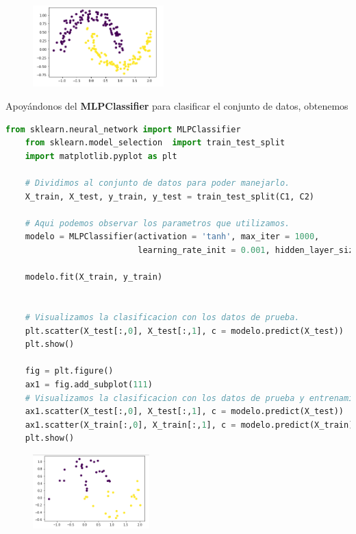 \documentclass[letterpaper,11pt]{article}
\begin{document}
\begin{enumerate}
    \begin{figure}[ht]
        \centering
        \includegraphics[width=0.45\textwidth]{./imagenes/datos.png}
    \end{figure}  
    
    Apoyándonos del \textbf{MLPClassifier} para clasificar el conjunto de 
    datos, obtenemos 
    \begin{lstlisting}[language=Python]
    from sklearn.neural_network import MLPClassifier
    from sklearn.model_selection  import train_test_split                       
    import matplotlib.pyplot as plt

    # Dividimos al conjunto de datos para poder manejarlo.
    X_train, X_test, y_train, y_test = train_test_split(C1, C2)

    # Aqui podemos observar los parametros que utilizamos.
    modelo = MLPClassifier(activation = 'tanh', max_iter = 1000, 
                           learning_rate_init = 0.001, hidden_layer_sizes = (10,4))

    modelo.fit(X_train, y_train)


    # Visualizamos la clasificacion con los datos de prueba. 
    plt.scatter(X_test[:,0], X_test[:,1], c = modelo.predict(X_test))
    plt.show()

    fig = plt.figure()
    ax1 = fig.add_subplot(111)
    # Visualizamos la clasificacion con los datos de prueba y entrenamiento.
    ax1.scatter(X_test[:,0], X_test[:,1], c = modelo.predict(X_test))
    ax1.scatter(X_train[:,0], X_train[:,1], c = modelo.predict(X_train))
    plt.show()
    \end{lstlisting}

    \begin{figure}[ht]
        \centering
        \includegraphics[width=0.4\textwidth]{./imagenes/clasificacion2-1.png}
    \end{figure} 


\end{enumerate}
\end{document}
